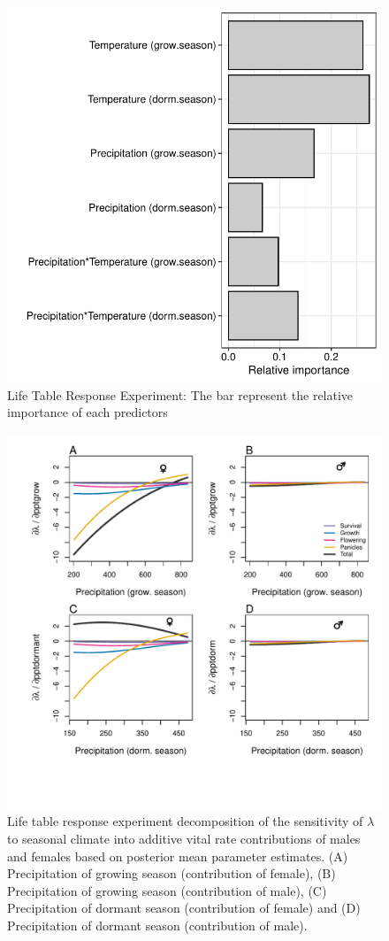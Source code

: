 \documentclass[12pt]{article}\usepackage[]{graphicx}\usepackage[dvipsnames]{xcolor}
\begin{document}
\begin{figure}[H]
  \begin{center}
    \includegraphics[width=0.65\linewidth]{Figures/Fig_LTRE.pdf}
  \caption{Life Table Response Experiment: The bar represent the relative importance of each predictors}
  \label{Sup:LTRE}
  \end{center}
\end{figure}

\begin{figure}[H]
  \begin{center}
    \includegraphics[width=0.98\linewidth]{Figures/LTRE_Precipitation.pdf}
  \caption{Life table response experiment decomposition of the sensitivity of $\lambda$ to seasonal climate into additive vital rate contributions of males and females based on posterior mean parameter estimates.
 (A) Precipitation of growing season (contribution of female), (B) Precipitation of growing season (contribution of male),  (C) Precipitation of dormant season (contribution of female) and (D) Precipitation of dormant season (contribution of male).}
  \label{Sup:LTRE_precip}
  \end{center}
\end{figure}
\end{document}
